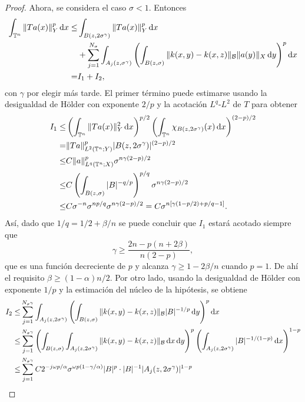 \begin{proof}
	Ahora, se considera el caso $\sigma<1$. Entonces 
	\begin{align*}
		\int_{\mathbb{T}^n}\|Ta(x)\|^p_Y \mathop{}\!\mathrm{d} x \leq & \int_{B(z,2\sigma^\gamma)}\|Ta(x)\|^p_Y \mathop{}\!\mathrm{d} x \\ 
		& + \sum_{j=1}^{N_\sigma} \int_{A_j(z,\sigma^\gamma)}\left( \int_{B(z,\sigma)} \|k(x, y) - k(x, z)\|_\mathcal{B} \|a(y)\|_X 
		\mathop{}\!\mathrm{d} y\right)^p \mathop{}\!\mathrm{d} x \\
		= & I_1 + I_2,
	\end{align*}
	con $\gamma$ por elegir más tarde.  El primer término puede estimarse usando la desigualdad de H\"older con exponente $2/p$ y la acotación $L^q$-$L^2$ de $T$ para obtener
	\begin{align*}
		I_1\leq & \left( \int_{\mathbb{T}^n} \|Ta(x)\|_Y^2\mathop{}\!\mathrm{d} x \right)^{p/2}\left( \int_{\mathbb{T}^n} \chi_{B(z,2\sigma^\gamma)}(x)\mathop{}\!\mathrm{d} x \right)^{(2-p)/2} \\
		= & \|Ta\|_{L^2(\mathbb{T}^n;Y)}^p|B(z,2\sigma^\gamma)|^{(2-p)/2} \\
		\leq & C\|a\|_{L^q(\mathbb{T}^n;X)}^p\sigma^{n\gamma(2-p)/2} \\
		\leq & C\left( \int_{B(z, \sigma)}|B|^{-q/p} \right)^{p/q}\sigma^{n\gamma(2-p)/2}  \\
		\leq & C\sigma^{-n}\sigma^{np/q}\sigma^{n\gamma(2-p)/2} = C\sigma^{n[\gamma(1-p/2) +p/q-1]}.
	\end{align*}
	Así, dado que $1/q=1/2+\beta/n$ se puede concluir que $I_1$ estará acotado siempre que 
	\begin{equation}
		\gamma \geq \frac{2n - p(n + 2\beta)}{n(2-p)}, 
		\label{eq:gamma-lowe-bound}
	\end{equation}
	que es una función decreciente de $p$ y alcanza $\gamma\geq1-2\beta/n$ cuando $p=1$. De ahí el requisito $\beta \geq (1-\alpha) n/2$.
	Por otro lado, usando la desigualdad de H\"older con exponente $1/p$ y la estimación del núcleo de la hipótesis, se obtiene 
	\begin{align*}
		I_2 \leq & \sum_{j=1}^{N_{\sigma^\gamma}}\int_{A_j(z,2\sigma^\gamma)}\left( \int_{B(z,\sigma)} \|k(x, y) - k(x, z)\|_\mathcal{B} |B|^{-1/p} 
		\diff y\right)^p \diff x \\
		\leq & \sum_{j=1}^{N_{\sigma^\gamma}} \left(\int_{B(z,\sigma)} \int_{A_j(z,2\sigma^\gamma)} \|k(x, y) - k(x, z)\|_\mathcal{B} \diff x\diff y \right)^p \left( \int_{A_j(z,2\sigma^\gamma)} |B|^{-1/(1-p)} \diff x \right)^{1-p} \\
		\leq & \sum_{j=1}^{N_{\sigma^\gamma}}  C2^{-j\omega p/\alpha}\sigma^{\omega p(1-\gamma/\alpha)}|B|^p \cdot |B|^{-1}|A_j(z, 2\sigma^\gamma)|^{1-p} \\

\end{align*}
\end{proof}
